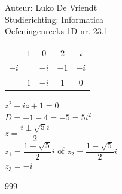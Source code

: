 \documentclass[a4paper]{article}
\begin{document}
\noindent \large Auteur: Luko De Vriendt\\
\noindent \large Studierichting: Informatica\\
\noindent \large Oefeningenreeks 1D nr. 23.1\\

\medskip

\normalsize

\begin{tabular}{c|cccc}
				& $1$ & $0$ 	& $2$ 	& $i$ \\
	$-i$	&			& $-i$	& $-1$	& $-i$ \\ \hline
				& $1$ & $-i$	& $1$ 	& $0$ \\
\end{tabular}

$ z^2 -iz + 1 = 0 $ \\

$ D = -1 -4 = -5 = 5i^2 $ \\

$ z = \dfrac{i \pm \sqrt{5}i}{2}$ \\

$ z_1 = \dfrac{1+\sqrt{5}}{2}i $ of $ z_2 = \dfrac{1-\sqrt{5}}{2}i $ \\

$ z_3 = -i $ \\

\begin{thebibliography}{999}
\end{thebibliography}
\end{document}
